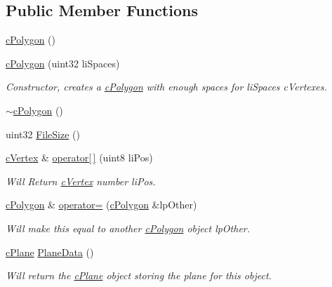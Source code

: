 \subsection*{Public Member Functions}
\begin{DoxyCompactItemize}
\item 
\hyperlink{classc_polygon_a0d3ef6dd759397e328528a4cb099c13c}{cPolygon} ()
\item 
\hyperlink{classc_polygon_a4aba6e9981515eb94ff17111552b44f5}{cPolygon} (uint32 liSpaces)
\begin{DoxyCompactList}\small\item\em Constructor, creates a \hyperlink{classc_polygon}{cPolygon} with enough spaces for liSpaces cVertexes. \item\end{DoxyCompactList}\item 
\hyperlink{classc_polygon_a4ce079379d6634982b00e0ab9c6d4c27}{$\sim$cPolygon} ()
\item 
uint32 \hyperlink{classc_polygon_ad5cc06e0ed44f34edee4b06cf42f3c17}{FileSize} ()
\item 
\hyperlink{classc_vertex}{cVertex} \& \hyperlink{classc_polygon_aba3627354a5ff0e391f2bfd20a00b2a5}{operator\mbox{[}$\,$\mbox{]}} (uint8 liPos)
\begin{DoxyCompactList}\small\item\em Will Return \hyperlink{classc_vertex}{cVertex} number liPos. \item\end{DoxyCompactList}\item 
\hyperlink{classc_polygon}{cPolygon} \& \hyperlink{classc_polygon_ae59b861d902cc11c7931c78d9f1ff1c7}{operator=} (\hyperlink{classc_polygon}{cPolygon} \&lpOther)
\begin{DoxyCompactList}\small\item\em Will make this equal to another \hyperlink{classc_polygon}{cPolygon} object lpOther. \item\end{DoxyCompactList}\item 
\hyperlink{classc_plane}{cPlane} \hyperlink{classc_polygon_afccff80dc9b3aec37599e5fbf46744d0}{PlaneData} ()
\begin{DoxyCompactList}\small\item\em Will return the \hyperlink{classc_plane}{cPlane} object storing the plane for this object. \item\end{DoxyCompactList}\item 

\end{DoxyCompactItemize}
